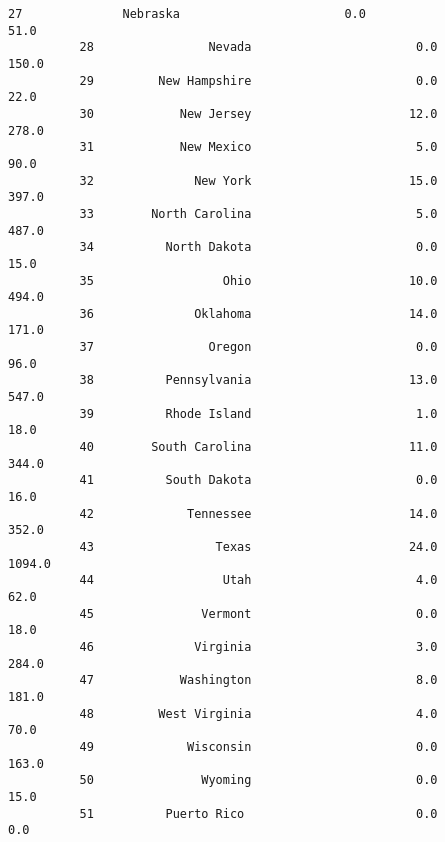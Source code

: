 \documentclass[11pt]{article}
\begin{document}
\begin{Verbatim}[commandchars=\\\{\}]
          27              Nebraska                       0.0                      51.0   
          28                Nevada                       0.0                     150.0   
          29         New Hampshire                       0.0                      22.0   
          30            New Jersey                      12.0                     278.0   
          31            New Mexico                       5.0                      90.0   
          32              New York                      15.0                     397.0   
          33        North Carolina                       5.0                     487.0   
          34          North Dakota                       0.0                      15.0   
          35                  Ohio                      10.0                     494.0   
          36              Oklahoma                      14.0                     171.0   
          37                Oregon                       0.0                      96.0   
          38          Pennsylvania                      13.0                     547.0   
          39          Rhode Island                       1.0                      18.0   
          40        South Carolina                      11.0                     344.0   
          41          South Dakota                       0.0                      16.0   
          42             Tennessee                      14.0                     352.0   
          43                 Texas                      24.0                    1094.0   
          44                  Utah                       4.0                      62.0   
          45               Vermont                       0.0                      18.0   
          46              Virginia                       3.0                     284.0   
          47            Washington                       8.0                     181.0   
          48         West Virginia                       4.0                      70.0   
          49             Wisconsin                       0.0                     163.0   
          50               Wyoming                       0.0                      15.0   
          51          Puerto Rico                        0.0                       0.0   
          

\end{Verbatim}
\end{document}
